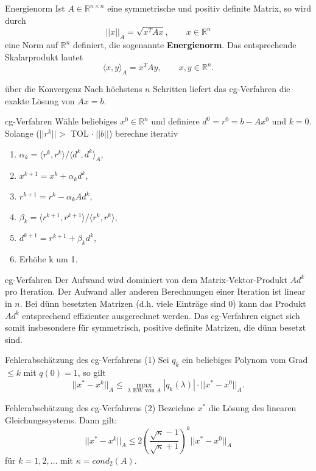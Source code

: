 
\begin{flashcard}[Definition]{Energienorm}
Ist $A \in \mathbb{R}^{n \times n}$ eine symmetrische und positiv definite Matrix, so wird durch
$$||x||_A = \sqrt{x^TAx}, \qquad x \in \mathbb{R}^n$$
eine Norm auf $\mathbb{R}^n$ definiert, die sogenannte \textbf{Energienorm}. Das entsprechende Skalarprodukt lautet
$$\langle x, y \rangle_A = x^TAy, \qquad x,y \in \mathbb{R}^n.$$
\end{flashcard}

\begin{flashcard}[Satz]{über die Konvergenz}
Nach höchstens $n$ Schritten liefert das cg-Verfahren die exakte Lösung von $Ax = b$.
\end{flashcard}

\begin{flashcard}[Algorithmus]{cg-Verfahren}
Wähle beliebiges $x^0 \in \mathbb{R}^n$ und definiere $d^0 = r^0 = b-Ax^0$ und $k=0$.\\
Solange ($||r^k|| >$ TOL $ \cdot \ ||b||$) berechne iterativ
\begin{enumerate}
	\item $\alpha_k = \langle r^k, r^k \rangle /  \langle d^k, d^k \rangle_A$,
	\item $x^{k+1} = x^k + \alpha_k d^k$,
	\item $r^{k+1} = r^k - \alpha_k Ad^k$,
	\item $\beta_k = \langle r^{k+1}, r^{k+1} \rangle / \langle r^k, r^k \rangle$,
	\item $d^{k+1} = r^{k+1} + \beta_k d^k$,
	\item Erhöhe k um 1.
\end{enumerate}
\end{flashcard}

\begin{flashcard}[Aufwand]{cg-Verfahren}
Der Aufwand wird dominiert von dem Matrix-Vektor-Produkt $Ad^k$ pro Iteration. Der Aufwand aller anderen Berechnungen einer Iteration ist linear in $n$. Bei dünn besetzten Matrizen (d.h. viele Einträge sind 0) kann das Produkt $Ad^k$ entsprechend effizienter ausgerechnet werden. Das cg-Verfahren eignet sich somit insbesondere für symmetrisch, positive definite Matrizen, die dünn besetzt sind.
\end{flashcard}

\begin{flashcard}[Satz]{Fehlerabschätzung des cg-Verfahrens (1)}
Sei $q_k$ ein beliebiges Polynom vom Grad $\leq k$ mit $q(0) = 1$, so gilt
$$||x^* - x^k||_A \leq \max_{\lambda \text{ EW von } A} |q_k(\lambda)| \cdot ||x^* - x^0||_A.$$
\end{flashcard}

\begin{flashcard}[Satz]{Fehlerabschätzung des cg-Verfahrens (2)}
Bezeichne $x^*$ die Lösung des linearen Gleichungssystems. Dann gilt:
$$||x^* - x^k||_A \leq 2 \left( \frac{\sqrt{\kappa}-1}{\sqrt{\kappa}+1}\right)^k ||x^* - x^0||_A$$
für $k = 1, 2, \ldots$ mit $\kappa = cond_2(A)$.
\end{flashcard}